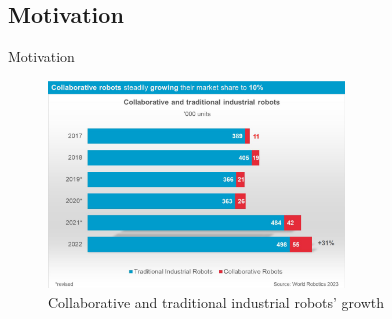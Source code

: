 \subsection{Motivation}
\begin{frame}{Motivation}
  \begin{figure}
    \centering
    \includegraphics[width=0.7\textwidth]{img/cobot_hist.png}
    \caption{Collaborative and traditional industrial robots' growth\footnotemark}
  \end{figure}
\end{frame}
